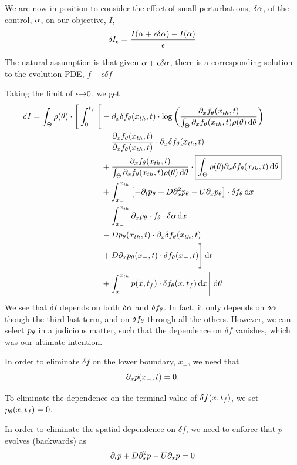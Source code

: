 We are now in position to consider the effect of small
perturbations, $\delta \alpha$, of the control, $\alpha$, on our objective, $I$,
$$
\delta I_\epsilon =\frac{I(\alpha + \epsilon \delta \alpha) - I(\alpha)}{{\epsilon}}
$$

The natural assumption is that given $\alpha +  \epsilon \delta \alpha$, there is a
corresponding solution to the evolution PDE, $f+ \epsilon \delta f$

Taking the limit of $\epsilon{\rightarrow}0$, we get
\begin{equation}
\begin{aligned}
\delta I =  
\int_\Theta  \rho({ \theta})\cdot\Bigg[ \int_0^{{t_f}} \Bigg[ 
&-   {\partial}_x \delta f_{ \theta}({ x_{th} }, t)  \cdot 
		\log \left( \frac{{\partial}_xf_{ \theta}({ x_{th} }, t)}
						{\int_\Theta {\partial}_xf_{ \theta}({ x_{th} }, t)\rho({ \theta})\, \mathrm{d} { \theta} } \right)
\\ 
	&-  \frac{ {\partial}_x f_{ \theta}({ x_{th} }, t)}{ {\partial}_x f_{ \theta}({ x_{th} }, t)}  \cdot {\partial}_x
		\delta f_{ \theta}({ x_{th} }, t)
\\ 
	&+    \frac{ {\partial}_x f_{ \theta}({ x_{th} }, t)}{	{\int_\Theta {\partial}_xf_{ \theta}({ x_{th} },
	t)\rho({ \theta})\, \mathrm{d} { \theta} }} \cdot
		 \boxed{\int_\Theta \rho({ \theta}) {\partial}_x \delta f_{ \theta}({ x_{th} }, t) 	\, \mathrm{d} { \theta}}				 
\\
 &+ \int_{x_-}^{{ x_{th} }} 
	\left[-{\partial}_tp_{ \theta} +  D{\partial}^2_xp_{ \theta}  - U {\partial}_xp_{ \theta} \right]\cdot  \delta f_{ \theta}
\, \mathrm{d} x
\\ & - \int_{x_-}^{{ x_{th} }}
{\partial}_xp_{ \theta} \cdot f_{ \theta}\cdot \delta \alpha \, \mathrm{d} x
\\
 &-   D p_{ \theta}({ x_{th} },t) \cdot {\partial}_x\delta f_{ \theta}({ x_{th} },t) 
\\
 &+  D{\partial}_xp_{ \theta}(x_-,t) \cdot\delta f_{ \theta}(x_-,t)
  \Bigg]			 \, \mathrm{d} t	
\\
&+\int_{x_-}^{{ x_{th} }} p(x, {t_f}) \cdot \delta f_{ \theta}(x, {t_f}) \, \mathrm{d} x  
   \Bigg]\, \mathrm{d} { \theta}	   
\end{aligned} 
\label{eq:differential_I_before_refactoring}
\end{equation}
We see that $\delta I$ depends on both $\delta \alpha$ and $\delta f_{ \theta}$. 
In fact, it only depends on $\delta \alpha$ though the third last term, and on
$\delta f_{ \theta}$ through all the others.
However, we can select $p_{ \theta}$ in a judicious matter, such that the
dependence on $\delta f$ vanishes, which was our ultimate intention.

In order to eliminate $\delta f$ on the lower boundary,
$x_-$, we need that $$ {\partial}_xp(x_-,t)=0.$$

To eliminate the dependence on the terminal value of $\delta f(x, {t_f})$, we set
$p_{ \theta}(x, {t_f})=0$.

In order to eliminate the spatial dependence on $\delta f$, we need to
enforce that $p$ evolves (backwards) as $${\partial}_t p + D{\partial}_x^2p - U {\partial}_x p = 0$$

